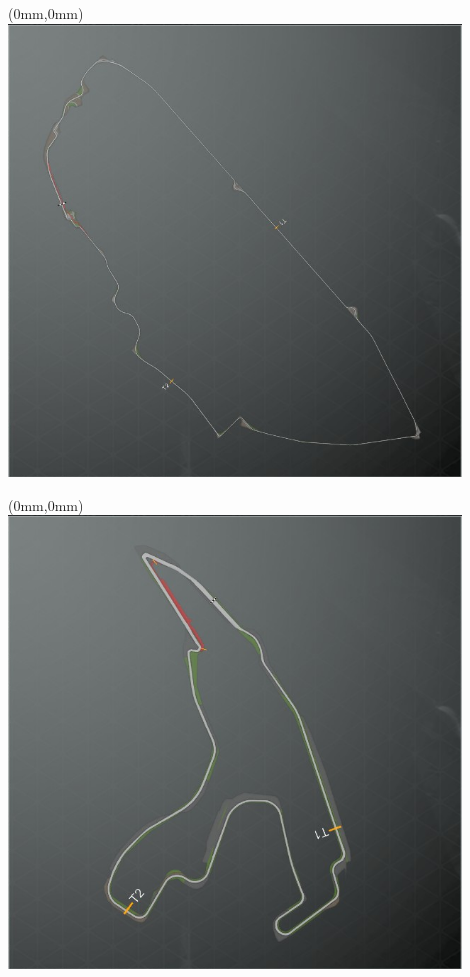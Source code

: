 \null\newpage
\begin{textblock*}{30mm}(0mm,0mm)%
\includegraphics[width=120mm]{TR/2015-05-20_00031.png}
\end{textblock*}
\null\newpage
\begin{textblock*}{30mm}(0mm,0mm)%
\includegraphics[width=120mm]{TR/2015-05-20_00021.png}
\end{textblock*}
